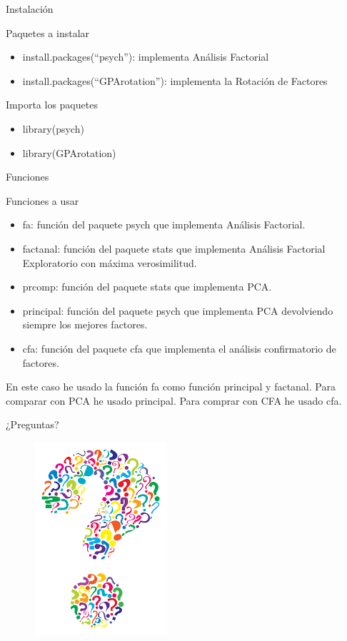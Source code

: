 \documentclass[10pt]{beamer}
\begin{document}
\begin{frame}[fragile]{Instalación}
	\vspace{10px}
	\pause
	\begin{block}{Paquetes a instalar}
		\begin{itemize}
			\item install.packages(``psych''): implementa Análisis Factorial
			\pause
			\item install.packages(``GPArotation''): implementa la Rotación de Factores
			\pause
		\end{itemize}
	\end{block}
	\vspace{10px}
	\pause
	\begin{alertblock}{Importa los paquetes}
		\begin{itemize}
			\item library(psych)
			\pause
			\item library(GPArotation)
			\pause
		\end{itemize}
	\end{alertblock}
\end{frame}

\begin{frame}[fragile]{Funciones}
\vspace{10px}
\pause
{}
\begin{block}{Funciones a usar}
	\begin{itemize}
		\item fa: función del paquete psych que implementa Análisis Factorial.
		\pause
		\item factanal: función del paquete stats que implementa Análisis Factorial Exploratorio con máxima verosimilitud.
		\pause
		\item prcomp: función del paquete stats que implementa PCA.
		\pause
		\item principal: función del paquete psych que implementa PCA devolviendo siempre los mejores factores.
		\item cfa: función del paquete cfa que implementa el análisis confirmatorio de factores.
		\pause
	\end{itemize}
	En este caso he usado la función fa como función principal y factanal. Para comparar con PCA he usado principal. Para comprar con CFA he usado cfa.
\end{block}
\end{frame}

\begin{frame}[standout]
	\LARGE{¿Preguntas?}
	\vspace{10px}
	\begin{figure}
		\includegraphics[scale=0.5]{./Imagenes/preguntas.png}
	\end{figure}
\end{frame}
\end{document}

